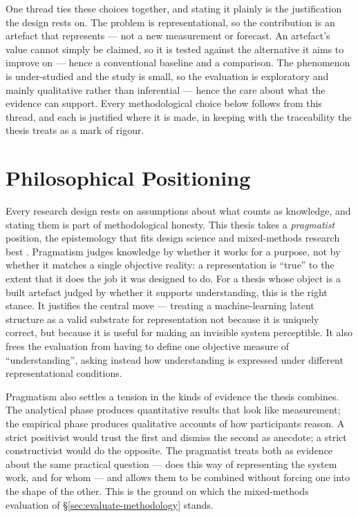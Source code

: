 One thread ties these choices together, and stating it plainly is the justification the design rests on. The problem is representational, so the contribution is an artefact that represents --- not a new measurement or forecast. An artefact's value cannot simply be claimed, so it is tested against the alternative it aims to improve on --- hence a conventional baseline and a comparison. The phenomenon is under-studied and the study is small, so the evaluation is exploratory and mainly qualitative rather than inferential --- hence the care about what the evidence can support. Every methodological choice below follows from this thread, and each is justified where it is made, in keeping with the traceability the thesis treats as a mark of rigour.

\section{Philosophical Positioning}
\label{sec:philosophical-positioning}

Every research design rests on assumptions about what counts as knowledge, and stating them is part of methodological honesty. This thesis takes a \emph{pragmatist} position, the epistemology that fits design science and mixed-methods research best \citep{peffers2007}. Pragmatism judges knowledge by whether it works for a purpose, not by whether it matches a single objective reality: a representation is ``true'' to the extent that it does the job it was designed to do. For a thesis whose object is a built artefact judged by whether it supports understanding, this is the right stance. It justifies the central move --- treating a machine-learning latent structure as a valid substrate for representation not because it is uniquely correct, but because it is useful for making an invisible system perceptible. It also frees the evaluation from having to define one objective measure of ``understanding'', asking instead how understanding is expressed under different representational conditions.

Pragmatism also settles a tension in the kinds of evidence the thesis combines. The analytical phase produces quantitative results that look like measurement; the empirical phase produces qualitative accounts of how participants reason. A strict positivist would trust the first and dismiss the second as anecdote; a strict constructivist would do the opposite. The pragmatist treats both as evidence about the same practical question --- does this way of representing the system work, and for whom --- and allows them to be combined without forcing one into the shape of the other. This is the ground on which the mixed-methods evaluation of \S\ref{sec:evaluate-methodology} stands.

